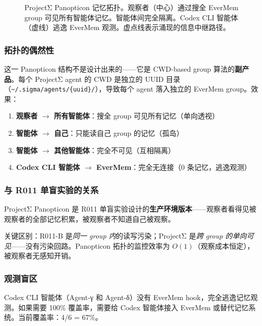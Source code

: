 \documentclass[11pt, a4paper]{article}
\begin{document}
\begin{figure}[H]
\caption{ProjectΣ Panopticon 记忆拓扑。观察者（中心）通过搜全 EverMem group 可见所有智能体记忆。智能体间完全隔离。Codex CLI 智能体（虚线）逃逸 EverMem 观测。虚点线表示涌现的信息中继路径。}
\label{fig:panopticon}
\end{figure}

\subsubsection{拓扑的偶然性}

这一 Panopticon 结构不是设计出来的——它是 CWD-based group 算法的\textbf{副产品}。每个 ProjectΣ agent 的 CWD 是独立的 UUID 目录（\texttt{\textasciitilde/.sigma/agents/\{uuid\}/}），导致每个 agent 落入独立的 EverMem group。效果：

\begin{enumerate}
  \item \textbf{观察者 $\to$ 所有智能体}：搜全 group 可见所有记忆（单向透视）
  \item \textbf{智能体 $\to$ 自己}：只能读自己 group 的记忆（孤岛）
  \item \textbf{智能体 $\to$ 其他智能体}：完全不可见（互相隔离）
  \item \textbf{Codex CLI 智能体 $\to$ EverMem}：完全无连接（0 条记忆，逃逸观测）
\end{enumerate}

\subsubsection{与 R011 单盲实验的关系}

ProjectΣ Panopticon 是 R011 单盲实验设计的\textbf{生产环境版本}——观察者看得见被观察者的全部记忆积累，被观察者不知道自己被观察。

关键区别：R011-B 是\textit{同一 group 内}的读写污染；ProjectΣ 是\textit{跨 group 的单向可见}——没有污染回路。Panopticon 拓扑的监控效率为 $O(1)$（观察成本恒定），被观察者无感知开销。

\subsubsection{观测盲区}

Codex CLI 智能体（Agent-γ 和 Agent-δ）没有 EverMem hook，完全逃逸记忆观测。如果需要 100\% 覆盖率，需要给 Codex 智能体接入 EverMem 或替代记忆系统。当前覆盖率：4/6 = 67\%。
\end{document}
